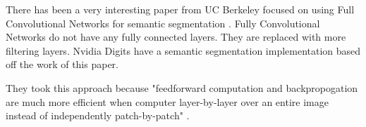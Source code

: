There has been a very interesting paper from UC Berkeley focused on using Full Convolutional
Networks for semantic segmentation \textcite{fcn}. Fully Convolutional Networks
do not have any fully connected layers. They are replaced with more filtering
layers. Nvidia Digits have a semantic segmentation implementation based off the
work of this paper.

They took this approach because "feedforward computation and backpropogation are
much more efficient when computer layer-by-layer over an entire image instead of
independently patch-by-patch" \textcite{fcn}.
